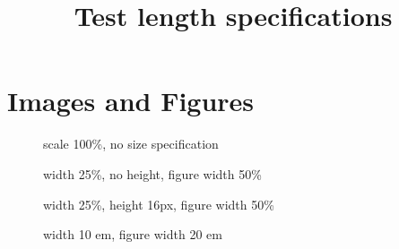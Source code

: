 \documentclass[a4paper]{article}
\title{Test length specifications%
  \label{test-length-specifications}}
\author{}
\date{}
\begin{document}
\maketitle


\section{Images and Figures%
  \label{images-and-figures}%
}

\begin{figure}
\noindent{}
\caption{scale 100\%, no size specification}
\end{figure}

\begin{figure}
\noindent{}
\caption{width 25\%, no height, figure width 50\%}
\end{figure}

\begin{figure}
\noindent{}
\caption{width 25\%, height 16px, figure width 50\%}
\end{figure}

\begin{figure}
\noindent{}
\caption{width 10 em, figure width 20 em}
\end{figure}
\end{document}
